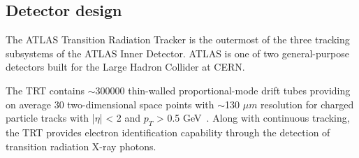\subsection{Detector design}
\label{subsec:trt_description}


The ATLAS Transition Radiation Tracker is the outermost of the three tracking subsystems of the ATLAS Inner Detector. 
ATLAS is one of two general-purpose detectors built for the Large Hadron Collider at CERN.

The TRT contains $\sim$300000 thin-walled proportional-mode drift tubes providing on average 30 two-dimensional 
space points with $\sim$130 $\mu m$ resolution for charged particle tracks with |$\eta$| < 2 and $p_T$ > 0.5 GeV~\cite{Abat:2008zza,Abat:2008zzb,Abat:2008zz}.
Along with continuous tracking, the TRT provides electron identification capability through the detection of transition radiation X-ray photons.






